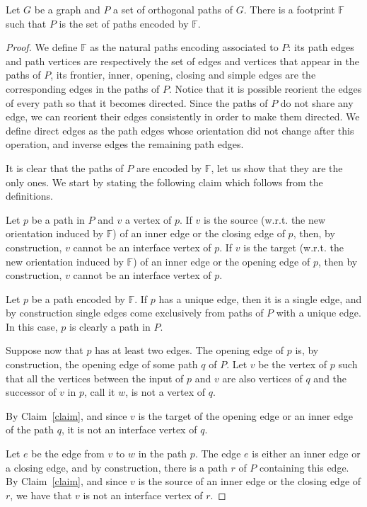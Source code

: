  \begin{proposition}\label{prop:encoding-guarded-sets-of-paths}
 Let $G$ be a graph and $P$ a set of orthogonal paths of $G$. There is a footprint $\mathbb{F}$ such that $P$ is the set of paths encoded by $\mathbb{F}$.
\end{proposition} 
\begin{proof}
 We define $\mathbb{F}$ as the natural paths encoding associated to $P$: its path edges and path vertices are respectively the set of edges and vertices that appear in the paths of $P$, its frontier, inner, opening, closing and simple edges are the corresponding edges in the paths of $P$. Notice that it is possible reorient the edges of every path so that it becomes directed. Since the paths of $P$ do not share any edge, we can reorient their edges consistently in order to make them directed. We define direct edges as the path edges whose orientation did not change after this operation,  and inverse edges the remaining path edges.
\smallskip

It is clear that the paths of $P$ are encoded by $\mathbb{F}$, let us show that they are the only ones. We start by stating the following claim which follows from the definitions.
\begin{claim}\label{claim}
Let $p$ be a path in $P$ and $v$ a vertex of $p$. If $v$ is the source (w.r.t. the new orientation induced by $\mathbb{F}$) of an inner edge or the closing edge of $p$, then, by construction, $v$ cannot be an interface vertex of $p$. If $v$ is the target (w.r.t. the new orientation induced by $\mathbb{F}$) of an inner edge or the opening edge of $p$, then by construction, $v$ cannot be an interface vertex of $p$.
\end{claim}
Let $p$ be a path encoded by $\mathbb{F}$. If $p$ has a unique edge, then it is a single edge, and by construction single edges come exclusively from paths of $P$ with a unique edge. In this case, $p$ is clearly a path in $P$. 

Suppose now that $p$ has at least two edges. The opening edge of $p$ is, by construction, the opening edge of some path $q$ of $P$. Let $v$ be the vertex of $p$ such that all the vertices between the input of $p$ and $v$ are also vertices of $q$ and the successor of $v$ in $p$, call it $w$, is not a vertex of $q$. 

By Claim~\ref{claim}, and since $v$ is the target of the opening edge or an inner edge of the path $q$, it is not an interface vertex of $q$.

Let $e$ be the edge  from $v$ to $w$ in the path $p$. The edge $e$ is either an inner edge or a closing edge, and by construction, there is a path $r$ of $P$ containing this edge. By Claim~\ref{claim}, and since $v$ is the source of an inner edge or the closing edge of $r$, we have that $v$ is not an interface vertex of $r$. 


\end{proof}
